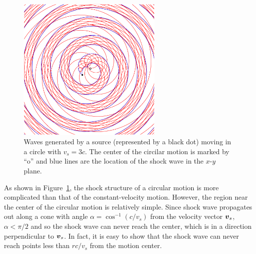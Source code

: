 \documentclass[12pt]{article}
\newcommand{\ve}[1]{\mbox{\boldmath $#1$}}
\begin{document}
\begin{figure}
\vskip -5mm
\includegraphics[width=7cm]{circular3c.png}
\caption{Waves generated by a source (represented by a black dot) moving in 
a circle with $v_s=3c$. The center 
of the circilar motion is marked by ``o'' and blue lines are the location of the shock 
wave in the $x$-$y$ plane.}
\label{fig:circular3c}
\vskip 5mm
\end{figure}

As shown in Figure~\ref{fig:circular3c}, the shock structure of a circular motion 
is more complicated than that of the constant-velocity motion. However, the region 
near the center of the circular motion is relatively simple. Since shock wave propagates 
out along a cone with angle $\alpha = \cos^{-1} (c/v_s)$ from the velocity vector 
$\ve{v}_s$, $\alpha < \pi/2$ and so the shock wave can never reach the center, which is 
in a direction perpendicular to $\ve{v}_s$. In fact, it is easy to show that the shock 
wave can never reach points less than $r c/v_s$ from the motion center.
\end{document}
